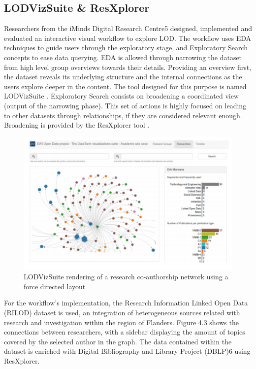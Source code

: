 \documentclass[a4paper,12pt,oneside]{report}
\begin{document}
{{{{\subsection{LODVizSuite \& ResXplorer}
{Researchers from the iMinds Digital Research Centre5 designed, implemented and evaluated an interactive visual workflow to explore LOD. The workflow uses EDA techniques to guide users through the exploratory stage, and Exploratory Search  concepts
to ease data querying. EDA is allowed through narrowing the dataset from high level group overviews towards their details. Providing an overview first, the dataset reveals its underlying structure and the internal connections as the users
explore deeper in the content. The tool designed for this purpose is named LODVizSuite .
Exploratory Search consists on broadening a coordinated view (output of the narrowing phase). This set of actions is highly focused on leading to other datasets through relationships, if they are considered relevant enough. Broadening is provided by the ResXplorer tool .
\begin{figure}[h!]
\centering
\includegraphics[width=1\textwidth]{Capture11}
\caption{LODVizSuite rendering of a research co-authorship network using a force directed layout}
\end{figure} }
{For the workflow’s implementation, the Research Information Linked Open Data (RILOD) dataset is used, an integration of heterogeneous sources related with research and investigation within the region of Flanders. Figure 4.3 shows the connections between researchers, with a sidebar displaying the amount of topics covered by the selected author in the graph. The data contained within the dataset is enriched with Digital Bibliography and Library Project (DBLP)6 using ResXplorer.}
}}}}
\end{document}
